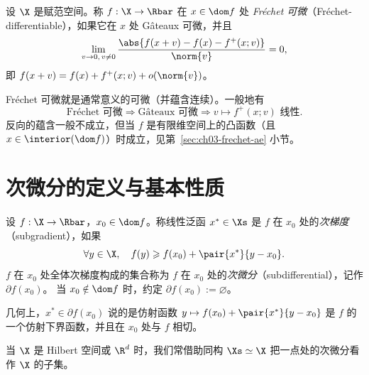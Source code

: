\begin{definition}[Fréchet 可微]
\label{def:23}
设 $\X$ 是赋范空间。称 $f:\X\to\Rbar$ 在 $x\in\dom f$ 处 \emph{Fréchet 可微}（Fréchet-differentiable），如果它在 $x$ 处 Gâteaux 可微，并且
\begin{equation}
  \lim_{v\to0,\,v\neq0}\frac{\abs{f(x+v)-f(x)-f^+(x;v)}}{\norm{v}}=0,
  \label{eq:10}
\end{equation}
即 $f(x+v)=f(x)+f^+(x;v)+o(\norm{v})$。
\end{definition}

\begin{remark}
\label{rem:13}
Fréchet 可微就是通常意义的可微（并蕴含连续）。一般地有
\[
  \text{Fréchet 可微}\Longrightarrow\text{Gâteaux 可微}\Longrightarrow v\mapsto f^+(x;v)\text{ 线性}.
\]
反向的蕴含一般不成立，但当 $f$ 是有限维空间上的凸函数（且 $x\in\interior(\dom f)$）时成立，见第~\ref{sec:ch03-frechet-ae} 小节。
\end{remark}

\section{次微分的定义与基本性质}

\begin{definition}[次梯度与次微分]
\label{def:24}
设 $f:\X\to\Rbar$，$x_0\in\dom f$。称线性泛函 $x^*\in\Xs$ 是 $f$ 在 $x_0$ 处的\emph{次梯度}（subgradient），如果
\[
  \forall y\in\X,\quad f(y)\geqslant f(x_0)+\pair{x^*}{y-x_0}.
\]
$f$ 在 $x_0$ 处全体次梯度构成的集合称为 $f$ 在 $x_0$ 处的\emph{次微分}（subdifferential），记作 $\partial f(x_0)$。
当 $x_0\notin\dom f$ 时，约定 $\partial f(x_0):=\varnothing$。
\end{definition}

几何上，$x^*\in\partial f(x_0)$ 说的是仿射函数 $y\mapsto f(x_0)+\pair{x^*}{y-x_0}$ 是 $f$ 的一个仿射下界函数，并且在 $x_0$ 处与 $f$ 相切。

\begin{remark}
\label{rem:14}
当 $\X$ 是 Hilbert 空间或 $\R^d$ 时，我们常借助同构 $\Xs\simeq\X$ 把一点处的次微分看作 $\X$ 的子集。
\end{remark}

